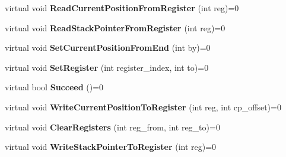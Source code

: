 \begin{DoxyCompactItemize}
\item 
\hypertarget{classv8_1_1internal_1_1_reg_exp_macro_assembler_a810b1e8b1bf498658765a4d3358b8ead}{}virtual void {\bfseries Read\+Current\+Position\+From\+Register} (int reg)=0\label{classv8_1_1internal_1_1_reg_exp_macro_assembler_a810b1e8b1bf498658765a4d3358b8ead}

\item 
\hypertarget{classv8_1_1internal_1_1_reg_exp_macro_assembler_a9da08910342d85b0ae9b444d9dd9a443}{}virtual void {\bfseries Read\+Stack\+Pointer\+From\+Register} (int reg)=0\label{classv8_1_1internal_1_1_reg_exp_macro_assembler_a9da08910342d85b0ae9b444d9dd9a443}

\item 
\hypertarget{classv8_1_1internal_1_1_reg_exp_macro_assembler_a7bd6e918db0bc938c5d26728c63b0b46}{}virtual void {\bfseries Set\+Current\+Position\+From\+End} (int by)=0\label{classv8_1_1internal_1_1_reg_exp_macro_assembler_a7bd6e918db0bc938c5d26728c63b0b46}

\item 
\hypertarget{classv8_1_1internal_1_1_reg_exp_macro_assembler_a545e20d50385d80782124f3562907417}{}virtual void {\bfseries Set\+Register} (int register\+\_\+index, int to)=0\label{classv8_1_1internal_1_1_reg_exp_macro_assembler_a545e20d50385d80782124f3562907417}

\item 
\hypertarget{classv8_1_1internal_1_1_reg_exp_macro_assembler_a1e08e084eb2fa2e7ebe538631fcaaefb}{}virtual bool {\bfseries Succeed} ()=0\label{classv8_1_1internal_1_1_reg_exp_macro_assembler_a1e08e084eb2fa2e7ebe538631fcaaefb}

\item 
\hypertarget{classv8_1_1internal_1_1_reg_exp_macro_assembler_ab2c114d6736c553fb03d898c05aa19ec}{}virtual void {\bfseries Write\+Current\+Position\+To\+Register} (int reg, int cp\+\_\+offset)=0\label{classv8_1_1internal_1_1_reg_exp_macro_assembler_ab2c114d6736c553fb03d898c05aa19ec}

\item 
\hypertarget{classv8_1_1internal_1_1_reg_exp_macro_assembler_af27c82d6793671c4e55baa50655943e4}{}virtual void {\bfseries Clear\+Registers} (int reg\+\_\+from, int reg\+\_\+to)=0\label{classv8_1_1internal_1_1_reg_exp_macro_assembler_af27c82d6793671c4e55baa50655943e4}

\item 
\hypertarget{classv8_1_1internal_1_1_reg_exp_macro_assembler_ab20c01102f11c10c5077539e898bf063}{}virtual void {\bfseries Write\+Stack\+Pointer\+To\+Register} (int reg)=0\label{classv8_1_1internal_1_1_reg_exp_macro_assembler_ab20c01102f11c10c5077539e898bf063}


\end{DoxyCompactItemize}
